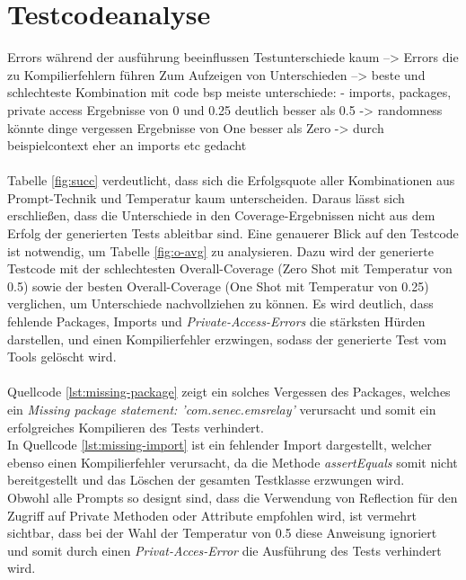 \section{Testcodeanalyse}
Errors während der ausführung beeinflussen Testunterschiede kaum --> Errors die zu Kompilierfehlern führen 
Zum Aufzeigen von Unterschieden --> beste und schlechteste Kombination mit code bsp
meiste unterschiede: - imports, packages, private access
Ergebnisse von 0 und 0.25 deutlich besser als 0.5
-> randomness könnte dinge vergessen
Ergebnisse von One besser als Zero
-> durch beispielcontext eher an imports etc gedacht\\\\
Tabelle \ref{fig:succ} verdeutlicht, dass sich die Erfolgsquote aller Kombinationen aus Prompt-Technik und Temperatur kaum unterscheiden. Daraus lässt sich erschließen, dass die Unterschiede in den Coverage-Ergebnissen nicht aus dem Erfolg der generierten Tests ableitbar sind. Eine genauerer Blick auf den Testcode ist notwendig, um Tabelle \ref{fig:o-avg} zu analysieren. Dazu wird der generierte Testcode mit der schlechtesten Overall-Coverage (Zero Shot mit Temperatur von 0.5) sowie der besten Overall-Coverage (One Shot mit Temperatur von 0.25) verglichen, um Unterschiede nachvollziehen zu können. Es wird deutlich, dass fehlende Packages, Imports und \textit{Private-Access-Errors} die stärksten Hürden darstellen, und einen Kompilierfehler erzwingen, sodass der generierte Test vom Tools gelöscht wird. \\\\
Quellcode \ref{lst:missing-package} zeigt ein solches Vergessen des Packages, welches ein \textit{Missing package statement: 'com.senec.emsrelay'} verursacht und somit ein erfolgreiches Kompilieren des Tests verhindert.\\

In Quellcode \ref{lst:missing-import} ist ein fehlender Import dargestellt, welcher ebenso einen Kompilierfehler verursacht, da die Methode \textit{assertEquals} somit nicht bereitgestellt und das Löschen der gesamten Testklasse erzwungen wird.\\

Obwohl alle Prompts so designt sind, dass die Verwendung von Reflection für den Zugriff auf Private Methoden oder Attribute empfohlen wird, ist vermehrt sichtbar, dass bei der Wahl der Temperatur von 0.5 diese Anweisung ignoriert und somit durch einen \textit{Privat-Acces-Error} die Ausführung des Tests verhindert wird.\\
